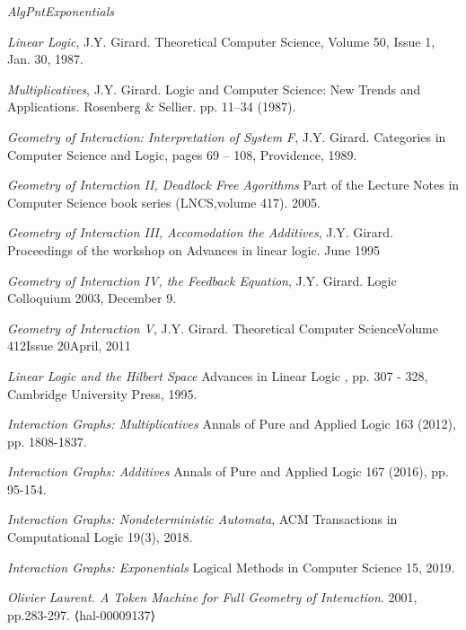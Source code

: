 \documentclass[12pt]{article}
\theoremstyle{plain}
\theoremstyle{definition}
\begin{document}

	\providecommand{\bysame}{\leavevmode\hbox to3em{\hrulefill}\thinspace}
	\providecommand{\href}[2]{#2}
	\begin{thebibliography}{99}
		 \emph{AlgPntExponentials}

		 \emph{Linear Logic}, J.Y. Girard. Theoretical Computer Science, Volume 50, Issue 1, Jan. 30, 1987.
		
		 \emph{Multiplicatives}, J.Y. Girard. Logic and Computer Science: New Trends and Applications. Rosenberg \& Sellier. pp. 11--34 (1987).
		
		 \emph{Geometry of Interaction: Interpretation of System F}, J.Y. Girard. Categories in Computer Science and Logic, pages 69 – 108, Providence, 1989.
		
		 \emph{Geometry of Interaction II, Deadlock Free Agorithms} Part of the Lecture Notes in Computer Science book series (LNCS,volume 417). 2005.
		
		 \emph{Geometry of Interaction III, Accomodation the Additives}, J.Y. Girard. Proceedings of the workshop on Advances in linear logic. June 1995
		
		 \emph{Geometry of Interaction IV, the Feedback Equation}, J.Y. Girard. Logic Colloquium 2003, December 9.
		
		 \emph{Geometry of Interaction V}, J.Y. Girard. Theoretical Computer ScienceVolume 412Issue 20April, 2011
		
		 \emph{Linear Logic and the Hilbert Space} Advances in Linear Logic , pp. 307 - 328, Cambridge University Press, 1995.
		
		 \emph{Interaction Graphs: Multiplicatives} Annals of Pure and Applied Logic 163 (2012), pp. 1808-1837.
		
		 \emph{Interaction Graphs: Additives} Annals of Pure and Applied Logic 167 (2016), pp. 95-154.
		
		 \emph{Interaction Graphs: Nondeterministic Automata}, ACM Transactions in Computational Logic 19(3), 2018.
		
		 \emph{Interaction Graphs: Exponentials} Logical Methods in Computer Science 15, 2019.
		
		 \emph{Olivier Laurent. A Token Machine for Full Geometry of Interaction}. 2001, pp.283-297. ⟨hal-00009137⟩
		

\end{thebibliography}
\end{document}
